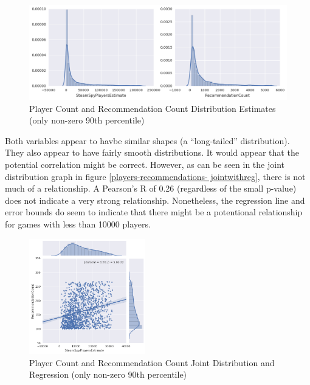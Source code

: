 \documentclass[letterpaper,10pt,twocolumn]{article}
\begin{document}
\begin{figure}[h]
    \label{fig:players-recommendations-dists}
    \caption{Player Count and Recommendation Count Distribution Estimates (only non-zero 90th percentile)}
    \includegraphics[width=\textwidth,keepaspectratio]{player-count-recommends-distribution}
\end{figure}

Both variables appear to havbe similar shapes (a ``long-tailed''
distribution). They also appear to have fairly smooth distributions. It would
appear that the potential correlation might be correct. However, as can be
seen in the joint distribution graph in figure \ref{players-recommendations-
jointwithreg}, there is not much of a relationship. A Pearson's R of 0.26
(regardless of the small p-value) does not indicate a very strong
relationship. Nonetheless, the regression line and error bounds do seem to
indicate that there might be a potentional relationship for games with less
than 10000 players.

\begin{figure}[H]
    \label{fig:players-recommendations-jointwithreg}
    \caption{Player Count and Recommendation Count Joint Distribution and Regression (only non-zero 90th percentile)}
    \includegraphics[width=0.45\textwidth,keepaspectratio]{player-count-recommends-jointwithreg}
\end{figure}


\end{document}
